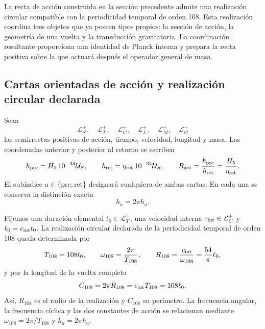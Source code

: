 \label{mdg:sec:identidad-autodual-planck-ct108-rev3}

La recta de acción construida en la sección precedente admite una
realización circular compatible con la periodicidad temporal de orden 108.
Esta realización coordina tres objetos que ya poseen tipos propios: la
sección de acción, la geometría de una vuelta y la transducción
gravitatoria. La coordinación resultante proporciona una identidad de
Planck interna y prepara la recta positiva sobre la que actuará después el
operador general de masa.

\subsection{Cartas orientadas de acción y realización circular declarada}

Sean
\[
 \mathcal L_S^+,\quad \mathcal L_T^+,\quad \mathcal L_C^+,
 \quad \mathcal L_L^+,\quad \mathcal L_M^+,\quad \mathcal L_G^+
\]
las semirrectas positivas de acción, tiempo, velocidad, longitud y masa.
Las coordenadas anterior y posterior al retorno se escriben
\begin{equation}
 \hbar_{\rm pre}=H_5\,10^{-34}\mathcal U_S,
 \qquad
 \hbar_{\rm ret}=\eta_{\rm ret}\,10^{-34}\mathcal U_S,
 \qquad
 R_{\rm act}=\frac{\hbar_{\rm pre}}{\hbar_{\rm ret}}
 =\frac{H_5}{\eta_{\rm ret}}.
 \label{mdg:eq:planck-ct108-cartas-pre-ret-rev3}
\end{equation}
El subíndice \(a\in\{\mathrm{pre},\mathrm{ret}\}\) designará cualquiera
de ambas cartas. En cada una se conserva la distinción exacta
\begin{equation}
 h_a=2\pi\hbar_a .
 \label{mdg:eq:planck-ct108-h-hbar-rev3}
\end{equation}

Fijemos una duración elemental \(t_0\in\mathcal L_T^+\), una velocidad
interna \(c_{\rm int}\in\mathcal L_C^+\) y
\(\ell_0=c_{\rm int}t_0\). La realización circular declarada de la
periodicidad temporal de orden 108 queda determinada por
\begin{equation}
 T_{108}=108t_0,
 \qquad
 \omega_{108}=\frac{2\pi}{T_{108}},
 \qquad
 R_{108}=\frac{c_{\rm int}}{\omega_{108}}
 =\frac{54}{\pi}\ell_0,
 \label{mdg:eq:planck-ct108-realizacion-circular-rev3}
\end{equation}
y por la longitud de la vuelta completa
\begin{equation}
 C_{108}=2\pi R_{108}=c_{\rm int}T_{108}=108\ell_0.
 \label{mdg:eq:planck-ct108-perimetro-rev3}
\end{equation}
Así, \(R_{108}\) es el radio de la realización y \(C_{108}\) su
perímetro. La frecuencia angular, la frecuencia cíclica y las dos
constantes de acción se relacionan mediante
\(\omega_{108}=2\pi/T_{108}\) y \(h_a=2\pi\hbar_a\).

